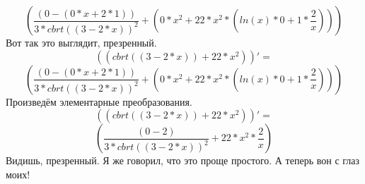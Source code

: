\documentclass[a4paper,12pt]{article}
\begin{document}
\begin{equation}
\left( {\frac{{\left( {0 }- {\left( {{0 }* {x }}+ {{2 }* {1 }}\right) }\right) }}{{{3 }* {{cbrt \left( {\left( {3 }- {{2 }* {x }}\right) }\right) }^ {2 }}}}}+ {\left( {{0 }* {{x }^ {2 }}}+ {{22 }* {{{x }^ {2 }}* {\left( {{ln \left( {x }\right) }* {0 }}+ {{1 }* {\frac{{2 }}{{x }}}}\right) }}}\right) }\right) 
\end{equation}
Вот так это выглядит, презренный.
\begin{equation}
\left( \left( {cbrt \left( {\left( {3 }- {{2 }* {x }}\right) }\right) }+ {{22 }* {{x }^ {2 }}}\right) \right)' =
\end{equation}
\begin{equation}
\left( {\frac{{\left( {0 }- {\left( {{0 }* {x }}+ {{2 }* {1 }}\right) }\right) }}{{{3 }* {{cbrt \left( {\left( {3 }- {{2 }* {x }}\right) }\right) }^ {2 }}}}}+ {\left( {{0 }* {{x }^ {2 }}}+ {{22 }* {{{x }^ {2 }}* {\left( {{ln \left( {x }\right) }* {0 }}+ {{1 }* {\frac{{2 }}{{x }}}}\right) }}}\right) }\right) 
\end{equation}
Произведём элементарные преобразования.
\begin{equation}
\left( \left( {cbrt \left( {\left( {3 }- {{2 }* {x }}\right) }\right) }+ {{22 }* {{x }^ {2 }}}\right) \right)' =
\end{equation}
\begin{equation}
\left( {\frac{{\left( {0 }- {2 }\right) }}{{{3 }* {{cbrt \left( {\left( {3 }- {{2 }* {x }}\right) }\right) }^ {2 }}}}}+ {{22 }* {{{x }^ {2 }}* {\frac{{2 }}{{x }}}}}\right) 
\end{equation}
Видишь, презренный. Я же говорил, что это проще простого.
А теперь вон с глаз моих!
\end{document}
